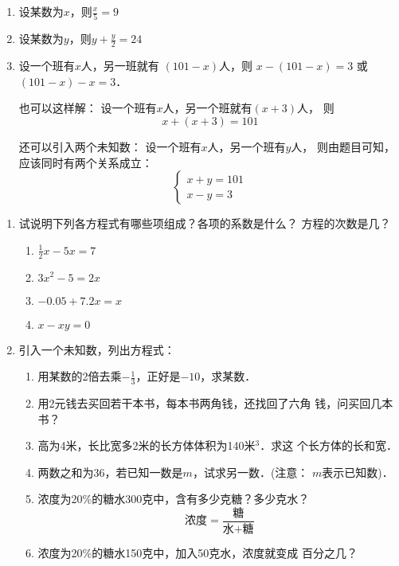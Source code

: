 \begin{solution}
\begin{enumerate}
    \item 设某数为$x$，则$\frac{x}{5}=9$
    \item 设某数为$y$，则$y+\frac{y}{2}=24$
    \item 设一个班有$x$人，另一班就有
  $(101-x)$人，则  $x-(101-x)=3$ 或   $(101-x)-x=3$．

也可以这样解：    设一个班有$x$人，另一个班就有$(x+3)$人，
      则$$x+(x+3)=101$$
      
还可以引入两个未知数：
    设一个班有$x$人，另一个班有$y$人，
则由题目可知，应该同时有两个关系成立：
\[\begin{cases}
    x+y=101\\
    x-y=3
\end{cases}\]
\end{enumerate}    
\end{solution}


\begin{ex}
\begin{enumerate}
    \item 试说明下列各方程式有哪些项组成？各项的系数是什么？
    方程的次数是几？
    \begin{multicols}{2}
        \begin{enumerate}
 \item $\frac{1}{2}x-5x=7$
 \item $3x^2-5=2x$
 \item $-0.05+7.2x=x$
 \item $x-xy=0$           
        \end{enumerate}
    \end{multicols}

\item 引入一个未知数，列出方程式：
\begin{enumerate}
    \item 用某数的2倍去乘$-\frac{1}{3}$，正好是$-10$，求某数．
    \item 用2元钱去买回若干本书，每本书两角钱，还找回了六角
  钱，问买回几本书？
  \item 高为4米，长比宽多2米的长方体体积为140米$^3$．求这
  个长方体的长和宽．
  \item 两数之和为36，若已知一数是$m$，试求另一数．(注意：
  $m$表示已知数)．
  \item 浓度为20\%的糖水300克中，含有多少克糖？多少克水？
  \[\text{浓度}=\frac{\text{糖}}{\text{水+糖}}\]
  \item 浓度为20\%的糖水150克中，加入50克水，浓度就变成
  百分之几？
\end{enumerate}
\end{enumerate}
\end{ex}

